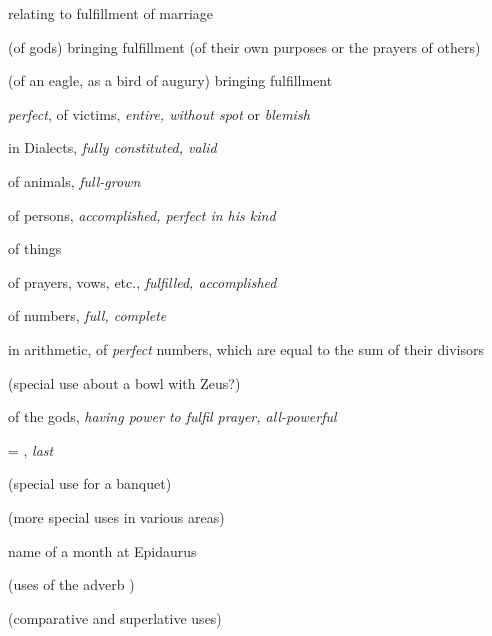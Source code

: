 \begin{compactdesc}
\begin{compactitem}
							\item[7] relating to fulfillment of marriage
							\item[8] (of gods) bringing fulfillment (of their own purposes or the prayers of others)
							\item[9] (of an eagle, as a bird of augury) bringing fulfillment
						\end{compactitem}
					\item[LSJ 1769b, PDF 1840] \textbf{}
						\begin{compactitem}
							\item[I.1.a] \textit{perfect}, of victims, \textit{entire, without spot} or \textit{blemish}
							\item[I.1.b] in Dialects, \textit{fully constituted, valid}
							\item[I.2] of animals, \textit{full-grown}
							\item[I.3.a] of persons, \textit{accomplished, perfect in his kind}
							\item[I.3.b] of things
							\item[I.4] of prayers, vows, etc., \textit{fulfilled, accomplished}
							\item[I.5.a] of numbers, \textit{full, complete}
							\item[I.5.b] in arithmetic, of \textit{perfect} numbers, which are equal to the sum of their divisors
							\item[I.6] (special use about a bowl with Zeus?)
							\item[II] of the gods, \textit{having power to fulfil prayer, all-powerful}
							\item[III] = , \textit{last}
							\item[IV] (special use for a banquet)
							\item[V] (more special uses in various areas)
							\item[VI] name of a month at Epidaurus
							\item[VII] (uses of the adverb )
							\item[VIII] (comparative and superlative uses)
						\end{compactitem}
				\end{compactdesc}
				
				
				\begin{compactdesc}
					\item[Some NT uses] \textbf{}
						\begin{compactdesc}
							\item[{\hyperref[MATTHEW-5-48]{Matthew 5:48}}]
						\end{compactdesc}
				\end{compactdesc}
				
